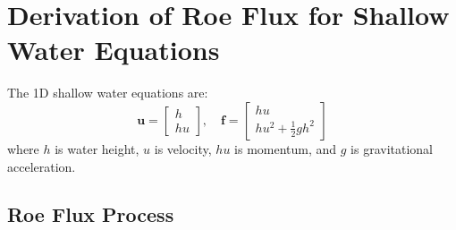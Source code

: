 \documentclass[12pt]{article}
\begin{document}
\section*{Derivation of Roe Flux for Shallow Water Equations}

The 1D shallow water equations are:
\[
\mathbf{u} = \begin{bmatrix} h \\ hu \end{bmatrix}, \quad \mathbf{f} = \begin{bmatrix} hu \\ hu^2 + \frac{1}{2}gh^2 \end{bmatrix}
\]
where \(h\) is water height, \(u\) is velocity, \(hu\) is momentum, and \(g\) is gravitational acceleration.

\subsection*{Roe Flux Process}
\end{document}
